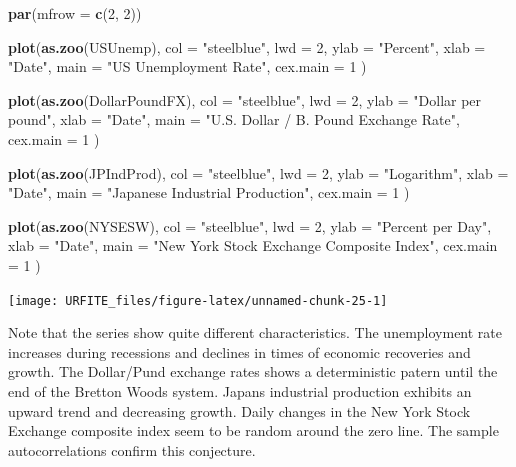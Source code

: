 \documentclass[]{book}
\newenvironment{Shaded}{\begin{snugshade}}{\end{snugshade}}
\newcommand{\KeywordTok}[1]{\textcolor[rgb]{0.13,0.29,0.53}{\textbf{#1}}}
\newcommand{\DataTypeTok}[1]{\textcolor[rgb]{0.13,0.29,0.53}{#1}}
\newcommand{\DecValTok}[1]{\textcolor[rgb]{0.00,0.00,0.81}{#1}}
\newcommand{\StringTok}[1]{\textcolor[rgb]{0.31,0.60,0.02}{#1}}
\newcommand{\NormalTok}[1]{#1}
\theoremstyle{definition}
\theoremstyle{definition}
\theoremstyle{definition}
\theoremstyle{remark}
\begin{document}
\begin{Shaded}
\begin{Highlighting}[]
\KeywordTok{par}\NormalTok{(}\DataTypeTok{mfrow =} \KeywordTok{c}\NormalTok{(}\DecValTok{2}\NormalTok{, }\DecValTok{2}\NormalTok{))}

\KeywordTok{plot}\NormalTok{(}\KeywordTok{as.zoo}\NormalTok{(USUnemp),}
     \DataTypeTok{col =} \StringTok{"steelblue"}\NormalTok{,}
     \DataTypeTok{lwd =} \DecValTok{2}\NormalTok{,}
     \DataTypeTok{ylab =} \StringTok{"Percent"}\NormalTok{,}
     \DataTypeTok{xlab =} \StringTok{"Date"}\NormalTok{,}
     \DataTypeTok{main =} \StringTok{"US Unemployment Rate"}\NormalTok{,}
     \DataTypeTok{cex.main =} \DecValTok{1}
\NormalTok{)}

\KeywordTok{plot}\NormalTok{(}\KeywordTok{as.zoo}\NormalTok{(DollarPoundFX),}
     \DataTypeTok{col =} \StringTok{"steelblue"}\NormalTok{,}
     \DataTypeTok{lwd =} \DecValTok{2}\NormalTok{,}
     \DataTypeTok{ylab =} \StringTok{"Dollar per pound"}\NormalTok{,}
     \DataTypeTok{xlab =} \StringTok{"Date"}\NormalTok{,}
     \DataTypeTok{main =} \StringTok{"U.S. Dollar / B. Pound Exchange Rate"}\NormalTok{,}
     \DataTypeTok{cex.main =} \DecValTok{1}
\NormalTok{)}

\KeywordTok{plot}\NormalTok{(}\KeywordTok{as.zoo}\NormalTok{(JPIndProd),}
     \DataTypeTok{col =} \StringTok{"steelblue"}\NormalTok{,}
     \DataTypeTok{lwd =} \DecValTok{2}\NormalTok{,}
     \DataTypeTok{ylab =} \StringTok{"Logarithm"}\NormalTok{,}
     \DataTypeTok{xlab =} \StringTok{"Date"}\NormalTok{,}
     \DataTypeTok{main =} \StringTok{"Japanese Industrial Production"}\NormalTok{,}
     \DataTypeTok{cex.main =} \DecValTok{1}
\NormalTok{)}

\KeywordTok{plot}\NormalTok{(}\KeywordTok{as.zoo}\NormalTok{(NYSESW),}
     \DataTypeTok{col =} \StringTok{"steelblue"}\NormalTok{,}
     \DataTypeTok{lwd =} \DecValTok{2}\NormalTok{,}
     \DataTypeTok{ylab =} \StringTok{"Percent per Day"}\NormalTok{,}
     \DataTypeTok{xlab =} \StringTok{"Date"}\NormalTok{,}
     \DataTypeTok{main =} \StringTok{"New York Stock Exchange Composite Index"}\NormalTok{,}
     \DataTypeTok{cex.main =} \DecValTok{1}
\NormalTok{)}
\end{Highlighting}
\end{Shaded}

\begin{center}\texttt{[image: URFITE\_files/figure-latex/unnamed-chunk-25-1]} \end{center}

Note that the series show quite different characteristics. The
unemployment rate increases during recessions and declines in times of
economic recoveries and growth. The Dollar/Pund exchange rates shows a
deterministic patern until the end of the Bretton Woods system. Japans
industrial production exhibits an upward trend and decreasing growth.
Daily changes in the New York Stock Exchange composite index seem to be
random around the zero line. The sample autocorrelations confirm this
conjecture.
\end{document}
